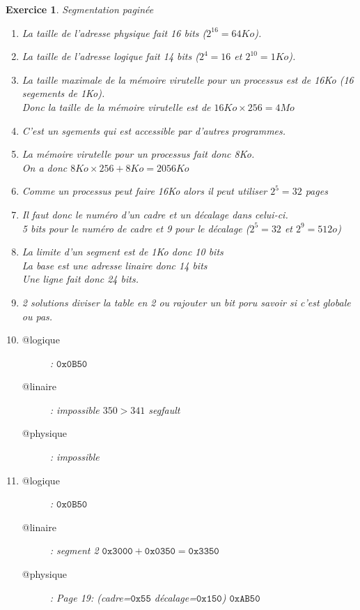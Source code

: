 \documentclass{article}
\theoremstyle{plain}
\newtheorem{exo}{Exercice}%
\begin{document}
\begin{exo} Segmentation paginée
\begin{enumerate}
    \item La taille de l'adresse physique fait 16 bits ($2^{16} = 64Ko$).
    \item La taille de l'adresse logique fait 14 bits ($2^4 = 16$ et $2^{10} = 1Ko$).
    \item La taille maximale de la mémoire virutelle pour un processus est de 16Ko (16 segements de 1Ko).\\
            Donc la taille de la mémoire virutelle est de $16Ko \times 256 = 4Mo$
    \item C'est un sgements qui est accessible par d'autres programmes.
    \item La mémoire virutelle pour un processus fait donc 8Ko.\\
            On a donc $8Ko \times 256 + 8Ko = 2056Ko$
    \item Comme un processus peut faire 16Ko alors il peut utiliser $2^5 = 32$ pages
    \item Il faut donc le numéro d'un cadre et un décalage dans celui-ci.\\
            5 bits pour le numéro de cadre et 9 pour le décalage 
            ($2^5 = 32$ et $2^9=512o$)
    \item La limite d'un segment est de 1Ko donc 10 bits\\
            La base est une adresse linaire donc 14 bits\\
            Une ligne fait donc 24 bits.
    \item 2 solutions diviser la table en 2 ou rajouter un bit poru savoir si 
            c'est globale ou pas.
    \item \begin{description}
        \item[@logique]: $\texttt{0x0B50}$ 
        \item[@linaire]: impossible $350 > 341$ segfault 
        \item[@physique]: impossible
        \end{description}
    \item \begin{description}
            \item[@logique]: $\texttt{0x0B50}$ 
            \item[@linaire]: segment 2 $\texttt{0x3000} + \texttt{0x0350} = \texttt{0x3350}$  
            \item[@physique]: Page 19: (cadre=$\texttt{0x55}$ 
                    décalage=$\texttt{0x150}$) $\texttt{0xAB50}$  
        \end{description}
\end{enumerate}
\end{exo}
\end{document}
